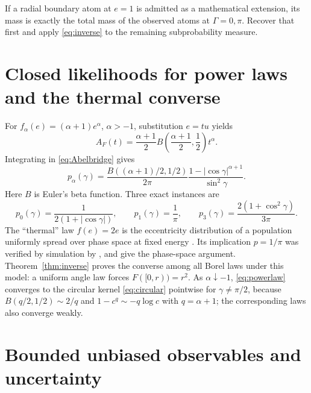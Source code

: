 \documentclass[11pt,a4paper]{article}
\theoremstyle{remark}\newtheorem{remark}[theorem]{Remark}
\begin{document}
If a radial boundary atom at $e=1$ is admitted as a mathematical extension, its mass is exactly the total mass of the observed atoms at $\Gamma=0,\pi$. Recover that first and apply \eqref{eq:inverse} to the remaining subprobability measure.

\section{Closed likelihoods for power laws and the thermal converse}\label{sec:powerlaw}

For $f_\alpha(e)=(\alpha+1)e^\alpha$, $\alpha>-1$, substitution $e=tu$ yields
\begin{equation}
A_F(t)=\frac{\alpha+1}{2}B\!\left(\frac{\alpha+1}{2},\frac12\right)t^\alpha.
\end{equation}
Integrating in \eqref{eq:Abelbridge} gives
\begin{equation}\label{eq:powerlaw}
\boxed{\quad p_\alpha(\gamma)=
\frac{B((\alpha+1)/2,1/2)}{2\pi}
\frac{1-|\cos\gamma|^{\alpha+1}}{\sin^2\gamma}.\quad}
\end{equation}
Here $B$ is Euler's beta function. Three exact instances are
\begin{equation}\label{eq:instances}
p_0(\gamma)=\frac{1}{2(1+|\cos\gamma|)},\qquad
p_1(\gamma)=\frac{1}{\pi},\qquad
p_3(\gamma)=\frac{2(1+\cos^2\gamma)}{3\pi}.
\end{equation}
The ``thermal'' law $f(e)=2e$ is the eccentricity distribution of a population uniformly spread over phase space at fixed energy \citep{Jeans1919}. Its implication $p=1/\pi$ was verified by simulation by \citet{Tokovinin1998}, and \citet{Hwang2022} give the phase-space argument. Theorem~\ref{thm:inverse} proves the converse among all Borel laws under this model: a uniform angle law forces $F([0,r))=r^2$. As $\alpha\downarrow-1$, \eqref{eq:powerlaw} converges to the circular kernel \eqref{eq:circular} pointwise for $\gamma\ne\pi/2$, because $B(q/2,1/2)\sim2/q$ and $1-c^q\sim-q\log c$ with $q=\alpha+1$; the corresponding laws also converge weakly.

\section{Bounded unbiased observables and uncertainty}\label{sec:moments}
\end{document}
